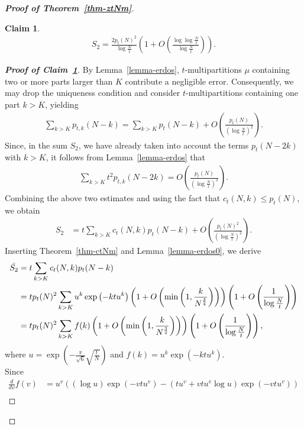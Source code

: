 \documentclass[11pt]{amsart}
\theoremstyle{plain}
\newtheorem{claim}[]{Claim}
\numberwithin{equation}{section}
\begin{document}
\begin{proof}[\textbf{\boldmath Proof of Theorem~\ref{thm-ztNm}}]
		\begin{claim}\label{claim-3}
			\begin{align*}
				S_2=\frac{2p_t(N)^{2}}{\log \frac{N}{t}}\left(1+O\left(\frac{\log \log \frac{N}{t}}{\log \frac{N}{t}}\right)\right).
			\end{align*} 
		\end{claim}
		\begin{proof}[\textbf{\boldmath Proof of Claim~\ref{claim-3}}]		
			By Lemma~\ref{lemma-erdos}, $t$-multipartitions $\mu$ containing two or more parts larger than $K$ contribute a negligible error. Consequently, we may drop the uniqueness condition and consider $t$-multipartitions containing one part $k > K$, yielding
			\begin{align*}
				\sum_{k>K} p_{t,k}(N-k)=\sum_{k>K}p_t(N-k)+O\left(\frac{p_t(N)}{\left(\log \frac{N}{t}\right)^{2}}\right).      
			\end{align*} 
			Since, in the sum $S_2$, we have already taken into account the terms $p_t(N-2k)$ with $k>K$, it follows from Lemma~\ref{lemma-erdos} that
			\begin{align*}
				\sum_{k>K} t^{2}p_{t,k}(N-2k)=O\left(\frac{p_t(N)}{\left(\log \frac{N}{t}\right)^{2}}\right).
			\end{align*} 
			Combining the above two estimates and using the fact that $c_t(N,k)\le p_t(N)$, we obtain
			\begin{align}\label{eq-ctNm}
				S_2&=t\sum_{k>K}c_t(N,k)p_t(N-k)+O\left(\frac{p_t(N)^{2}}{\left(\log \frac{N}{t}\right)^{2}}\right).
			\end{align}
			Inserting Theorem~\ref{thm-ctNm} and Lemma~\ref{lemma-erdos0}, we derive
			\begin{align}\label{eq-S2bar}
				\notag
				\bar{S_2}&=t\sum_{k>K}c_t(N,k)p_t(N-k)\\
				\notag
				&= tp_t(N)^{2}\sum_{k>K}u^{k}\exp\left(-ktu^{k}\right)\left(1+O\left(\min\left(1,\frac{k}{N^{\frac{3}{4}}}\right)\right)\right)\left(1+O\left(\frac{1}{\log \frac{N}{t}}\right)\right)\\
				&=tp_t(N)^{2}\sum_{k>K}f(k)\left(1+O\left(\min\left(1,\frac{k}{N^{\frac{3}{4}}}\right)\right)\right)\left(1+O\left(\frac{1}{\log \frac{N}{t}}\right)\right),
			\end{align}
			where $u=\exp\left(-\frac{\pi }{\sqrt{6}}\sqrt{\frac{t}{N}}\right)$ and $f(k)=u^{k}\exp\left(-ktu^{k}\right)$.\\
			Since  
			\begin{align*}
				\frac{d}{dv}f(v)&=u^{v}\left((\log u)\exp\left(-vtu^{v}\right)-(tu^{v}+vtu^{v}\log u)\exp\left(-vtu^{v}\right)\right) \\

\end{align*}
\end{proof}
\end{proof}
\end{document}

